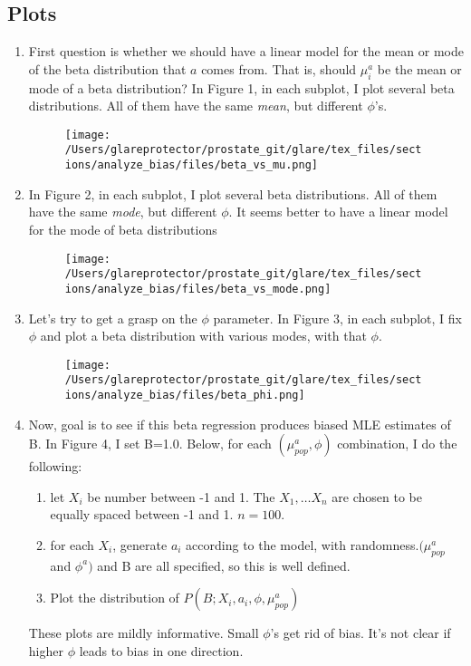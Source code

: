 \subsection{Plots}
\begin{enumerate}

\item First question is whether we should have a linear model for the mean or mode of the beta distribution that $a$ comes from.  That is, should $\mu_i^a$ be the mean or mode of a beta distribution?  In Figure 1, in each subplot, I plot several beta distributions.  All of them have the same \emph{mean}, but different $\phi$'s.  
\begin{figure}
\begin{center}
\texttt{[image: /Users/glareprotector/prostate\_git/glare/tex\_files/sections/analyze\_bias/files/beta\_vs\_mu.png]}
\caption{}
\end{center}
\end{figure}


\item In Figure 2, in each subplot, I plot several beta distributions.  All of them have the same \emph{mode}, but different $\phi$.  It seems better to have a linear model for the mode of beta distributions 
\begin{figure}
\begin{center}
\texttt{[image: /Users/glareprotector/prostate\_git/glare/tex\_files/sections/analyze\_bias/files/beta\_vs\_mode.png]}
\caption{}
\end{center}
\end{figure}

\item Let's try to get a grasp on the $\phi$ parameter.  In Figure 3, in each subplot, I fix $\phi$ and plot a beta distribution with various modes, with that $\phi$.
\begin{figure}
\begin{center}
\texttt{[image: /Users/glareprotector/prostate\_git/glare/tex\_files/sections/analyze\_bias/files/beta\_phi.png]}
\caption{}
\end{center}
\end{figure}

\item Now, goal is to see if this beta regression produces biased MLE estimates of B.  In Figure 4, I set B=1.0.  Below, for each $(\mu_{pop}^a,\phi)$ combination, I do the following: 
    \begin{enumerate}
    \item let $X_i$ be number between -1 and 1.  The $X_1, \ldots X_n$ are chosen to be equally spaced between -1 and 1.  $n=100$.
    \item for each $X_i$, generate $a_i$ according to the model, with randomness.$(\mu_{pop}^a$ and $\phi^a)$ and B are all specified, so this is well defined.  
    \item Plot the distribution of $P(B;X_i,a_i,\phi,\mu_{pop}^a)$  
    \end{enumerate}
These plots are mildly informative.  Small $\phi$'s get rid of bias.  It's not clear if higher $\phi$ leads to bias in one direction.    


\end{enumerate}
